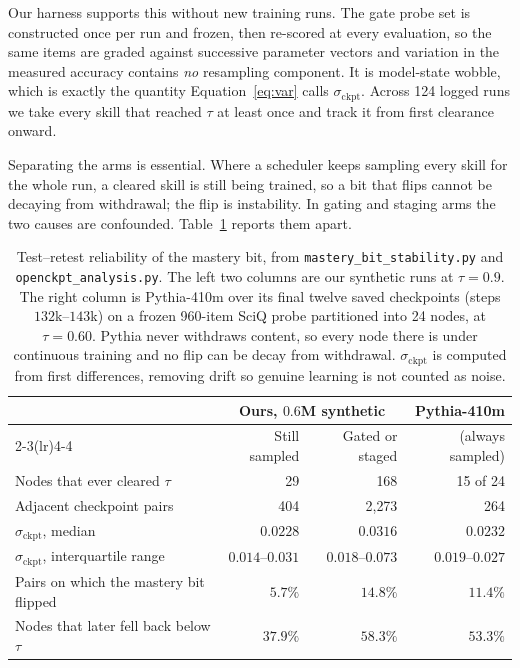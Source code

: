 \documentclass[11pt]{article}
\theoremstyle{plain}
\theoremstyle{definition}
\theoremstyle{remark}
\begin{document}
Our harness supports this without new training runs. The gate probe set is
constructed once per run and frozen, then re-scored at every evaluation, so the
same items are graded against successive parameter vectors and variation in the
measured accuracy contains \emph{no} resampling component. It is model-state
wobble, which is exactly the quantity Equation~\ref{eq:var} calls
$\sigma_{\text{ckpt}}$. Across 124 logged runs we take every skill that reached
$\tau$ at least once and track it from first clearance onward.

Separating the arms is essential. Where a scheduler keeps sampling every skill
for the whole run, a cleared skill is still being trained, so a bit that flips
cannot be decaying from withdrawal; the flip is instability. In gating and
staging arms the two causes are confounded. Table~\ref{tab:bitstability} reports
them apart.

\begin{table}[ht]
\centering
\small
\begin{tabular}{@{}lrrr@{}}
\toprule
& \multicolumn{2}{c}{Ours, $0.6$M synthetic} & Pythia-410m \\
\cmidrule(lr){2-3}\cmidrule(lr){4-4}
& Still sampled & Gated or staged & (always sampled) \\
\midrule
Nodes that ever cleared $\tau$ & 29 & 168 & 15 of 24 \\
Adjacent checkpoint pairs & 404 & 2{,}273 & 264 \\
$\sigma_{\text{ckpt}}$, median & $\mathbf{0.0228}$ & $0.0316$ & $\mathbf{0.0232}$ \\
$\sigma_{\text{ckpt}}$, interquartile range & $0.014$--$0.031$ & $0.018$--$0.073$ & $0.019$--$0.027$ \\
Pairs on which the mastery bit flipped & $5.7\%$ & $14.8\%$ & $\mathbf{11.4\%}$ \\
Nodes that later fell back below $\tau$ & $37.9\%$ & $58.3\%$ & $\mathbf{53.3\%}$ \\
\bottomrule
\end{tabular}
\caption{Test--retest reliability of the mastery bit, from
\texttt{mastery\_bit\_stability.py} and \texttt{openckpt\_analysis.py}. The left
two columns are our synthetic runs at $\tau = 0.9$. The right column is
Pythia-410m over its final twelve saved checkpoints (steps $132$k--$143$k) on a frozen 960-item SciQ
probe partitioned into 24 nodes, at $\tau = 0.60$. Pythia never withdraws
content, so every node there is under continuous training and no flip can be
decay from withdrawal. $\sigma_{\text{ckpt}}$ is computed from first differences,
removing drift so genuine learning is not counted as noise.}
\label{tab:bitstability}
\end{table}
\end{document}

